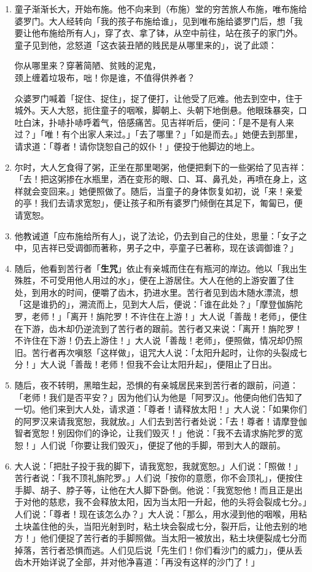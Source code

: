 \begin{enumerate}
\item 童子渐渐长大，开始布施。他不向来到（布施）堂的穷苦旅人布施，唯布施给婆罗门。大人经转向「我的孩子布施给谁」，见到唯布施给婆罗门后，想「我要让他布施给所有人」，穿了衣、拿了钵，从空中前往，站在孩子的家门外。童子见到他，忿怒道「这衣装丑陋的贱民是从哪里来的」，说了此颂：\begin{quoting}你从哪里来？穿著简陋、贫贱的泥鬼，\\颈上缠着垃圾布，咄！你是谁，不值得供养者？\end{quoting}众婆罗门喊着「捉住、捉住」，捉了便打，让他受了厄难。他去到空中，住于城外。天人大怒，扼住童子的咽喉，脚朝上、头朝下地倒悬。他眼珠暴突，口吐白沫，扑哧扑哧呼着气，倍感痛苦。见吉祥听后，便问：「是不是有人来过？」「唯！有个出家人来过。」「去了哪里？」「如是而去。」她便去到那里，请求道：「尊者！请你饶恕自己的奴仆！」便投于他脚边的地上。
\item 尔时，大人乞食得了粥，正坐在那里喝粥，他便把剩下的一些粥给了见吉祥：「去！把这粥掺在水瓶里，洒在变形的眼、口、耳、鼻孔处，再喷在身上，这样就会变回来。」她便照做了。随后，当童子的身体恢复如初，说「来！亲爱的亭！我们去请求宽恕」，便让孩子和所有婆罗门倾倒在其足下，匍匐已，便请宽恕。
\item 他教诫道「应布施给所有人」，说了法论，仍去到自己的住处，思量：「女子之中，见吉祥已受调御而著称，男子之中，亭童子已著称，现在该调御谁？」
\item 随后，他看到苦行者「\textbf{生咒}」依止有亲城而住在有瓶河的岸边。他以「我出生殊胜，不可受用他人用过的水」，便在上游居住。大人在他的上游安置了住处，到用水的时间，便嚼了齿木，扔进水里。苦行者见到齿木随水漂流，想「这是谁扔的」，溯流而上，见到大人后，便说：「谁在此处？」「摩登伽旃陀罗，老师！」「离开！旃陀罗！不许住在上游！」大人说「善哉！老师」，便住在下游，齿木却仍逆流到了苦行者的跟前。苦行者又来说：「离开！旃陀罗！不许住在下游！仍去上游住！」大人说「善哉！老师」，便照做，情况却仍照旧。苦行者再次嗔怒「这样做」，诅咒大人说：「太阳升起时，让你的头裂成七分！」大人说「善哉！老师！但我不会让太阳升起」，便阻止了日出。
\item 随后，夜不转明，黑暗生起，恐惧的有亲城居民来到苦行者的跟前，问道：「老师！我们是否平安？」因为他们认为他是「阿罗汉」。他便向他们告知了一切。他们来到大人处，请求道：「尊者！请释放太阳！」大人说：「如果你们的阿罗汉来请我宽恕，我就放。」人们去到苦行者处说：「去！尊者！请摩登伽智者宽恕！别因你们的诤论，让我们毁灭！」他说：「我不去请求旃陀罗的宽恕！」人们说「你要让我们毁灭」，便捉了他的手脚，带到大人的跟前。
\item 大人说：「把肚子投于我的脚下，请我宽恕，我就宽恕。」人们说：「照做！」苦行者说：「我不顶礼旃陀罗。」人们说「按你的意愿，你不会顶礼」，便按住手脚、胡子、脖子等，让他在大人脚下卧倒。他说：「我宽恕他！而且正是出于对他的慈悲，我不会释放太阳，因为当太阳一升起，他的头将会裂成七分。」人们说：「尊者！现在该怎么办？」大人说：「那么，用水浸到他的咽喉，用粘土块盖住他的头，当阳光射到时，粘土块会裂成七分，裂开后，让他去别的地方！」他们便捉了苦行者的手脚照做。当太阳一被放出，粘土块便裂成七分而掉落，苦行者恐惧而逃。人们见后说「先生们！你们看沙门的威力」，便从丢齿木开始详说了全部，并对他净喜道：「再没有这样的沙门了！」

\end{enumerate}
